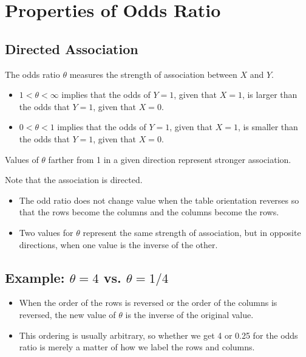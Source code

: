 \section{Properties of Odds Ratio}
\subsection{Directed Association}
The odds ratio $\theta$ measures the strength of association between $X$ and $Y$.
\begin{itemize}
	\item $1 < \theta < \infty$ implies that the odds of $Y = 1$, given that $X = 1$, is larger than the odds that $Y = 1$, given that $X = 0$.
	\item $0 < \theta < 1$ implies that the odds of $Y = 1$, given that $X = 1$, is smaller than the odds that $Y = 1$, given that $X = 0$.
\end{itemize}

Values of $\theta$ farther from 1 in a given direction represent stronger association.

Note that the association is directed.

\begin{itemize}
	\item The odd ratio does not change value when the table orientation reverses so that the rows become the columns and the columns become the rows.
	\item Two values for $\theta$ represent the same strength of association, but
in opposite directions, when one value is the inverse of the other.
\end{itemize}

\subsection{Example: $\theta = 4$ vs. $\theta = 1/4$}
\begin{itemize}
	\item When the order of the rows is reversed or the order of the
	columns is reversed, the new value of $\theta$ is the inverse of the
	original value.
	\item This ordering is usually arbitrary, so whether we get 4 or 0.25 for
	the odds ratio is merely a matter of how we label the rows and
columns.
\end{itemize}

